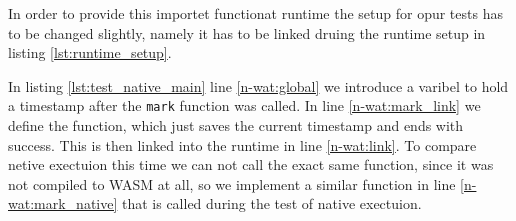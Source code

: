 In order to provide this importet functionat runtime the setup for opur tests has to be changed slightly, namely it has to be linked druing the runtime setup in listing \ref{lst:runtime_setup}.

In listing \ref{lst:test_native_main} line \ref{n-wat:global} we introduce a varibel to hold a timestamp after the \lstinline{mark} function was called. In line \ref{n-wat:mark_link} we define the function, which just saves the current timestamp and ends with success. This is then linked into the runtime in line \ref{n-wat:link}. To compare netive exectuion this time we can not call the exact same function, since it was not compiled to WASM at all, so we implement a similar function in line \ref{n-wat:mark_native} that is called during the test of native exectuion.